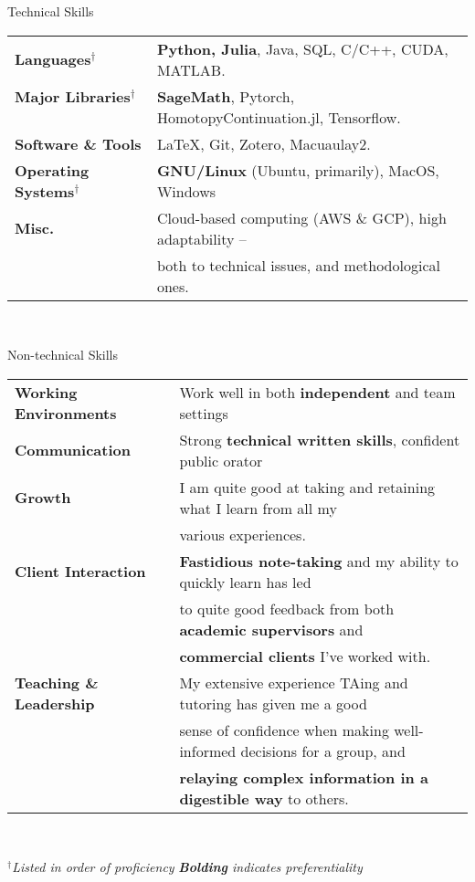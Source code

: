 \begin{rSection}{Technical Skills}

\begin{tabular}{ @{} >{\bfseries}l @{\hspace{6ex}} l }

  						 
  Languages$^\dagger$  \ & \textbf{Python, Julia}, Java, SQL, C/C++, CUDA, MATLAB.
  \\Major Libraries$^\dagger$ \ & \textbf{SageMath}, Pytorch, HomotopyContinuation.jl, Tensorflow.
  \\Software \& Tools & \LaTeX, Git, Zotero, Macuaulay2.
  \\Operating Systems$^\dagger$ \ & \textbf{GNU/Linux} (Ubuntu, primarily), MacOS, Windows
  \\Misc. \ & Cloud-based computing (AWS \& GCP), high adaptability -- \\ & both to technical issues, and methodological ones.
  \end{tabular}\\

\end{rSection}

\clearpage

\begin{rSection}{Non-technical Skills}

\begin{tabular}{ @{} >{\bfseries}l @{\hspace{6ex}} l }

  Working Environments  \ & Work well in both \textbf{independent} and team settings \\
  Communication \ & Strong \textbf{technical written skills}, confident public orator \\
  Growth \ & I am quite good at taking and retaining what I learn from all my \\ & various experiences.
  \\
  Client Interaction \ & \textbf{Fastidious note-taking} and my ability to quickly learn has led \\ & to quite good feedback from both \textbf{academic supervisors} and \\ & \textbf{commercial clients} I've worked with.
  \\Teaching \& Leadership \ & My extensive experience TAing and tutoring has given me a good \\ & sense of confidence when making well-informed decisions for a group, and \\ & \textbf{relaying complex information in a digestible way} to others.
\end{tabular}\\

\end{rSection}

\smallskip
\emph{$^\dagger$Listed in order of proficiency} \hfill
\emph{\textbf{Bolding} indicates preferentiality}